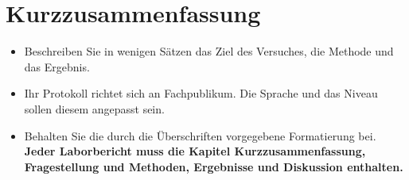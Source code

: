 \section*{Kurzzusammenfassung}
\begin{itemize}
    \item Beschreiben Sie in wenigen S\"atzen das Ziel des Versuches, die Methode und das Ergebnis.
    \item Ihr Protokoll richtet sich an Fachpublikum. Die Sprache und das Niveau sollen diesem angepasst sein. 
    \item Behalten Sie die durch die \"Uberschriften vorgegebene Formatierung bei. \textbf{Jeder Laborbericht muss die Kapitel Kurzzusammenfassung, Fragestellung und Methoden, Ergebnisse und Diskussion enthalten.}
\end{itemize} 
